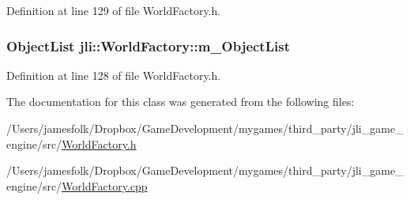 Definition at line 129 of file World\+Factory.\+h.

\hypertarget{classjli_1_1_world_factory_ac1a42314be66db6555d7723a35d2cdbc}{
\subsubsection[{m\+\_\+\+Object\+List}]{\setlength{\rightskip}{0pt plus 5cm}Object\+List jli\+::\+World\+Factory\+::m\+\_\+\+Object\+List}}\label{classjli_1_1_world_factory_ac1a42314be66db6555d7723a35d2cdbc}


Definition at line 128 of file World\+Factory.\+h.



The documentation for this class was generated from the following files\+:\begin{DoxyCompactItemize}
\item 
/\+Users/jamesfolk/\+Dropbox/\+Game\+Development/mygames/third\+\_\+party/jli\+\_\+game\+\_\+engine/src/\hyperlink{_world_factory_8h}{World\+Factory.\+h}\item 
/\+Users/jamesfolk/\+Dropbox/\+Game\+Development/mygames/third\+\_\+party/jli\+\_\+game\+\_\+engine/src/\hyperlink{_world_factory_8cpp}{World\+Factory.\+cpp}\end{DoxyCompactItemize}
